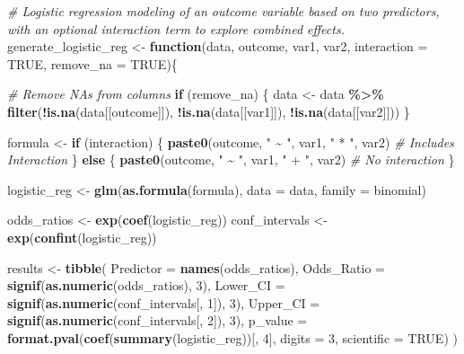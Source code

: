 \documentclass[
]{article}
\newenvironment{Shaded}{\begin{snugshade}}{\end{snugshade}}
\newcommand{\AttributeTok}[1]{\textcolor[rgb]{0.13,0.29,0.53}{#1}}
\newcommand{\CommentTok}[1]{\textcolor[rgb]{0.56,0.35,0.01}{\textit{#1}}}
\newcommand{\ConstantTok}[1]{\textcolor[rgb]{0.56,0.35,0.01}{#1}}
\newcommand{\ControlFlowTok}[1]{\textcolor[rgb]{0.13,0.29,0.53}{\textbf{#1}}}
\newcommand{\DecValTok}[1]{\textcolor[rgb]{0.00,0.00,0.81}{#1}}
\newcommand{\FunctionTok}[1]{\textcolor[rgb]{0.13,0.29,0.53}{\textbf{#1}}}
\newcommand{\NormalTok}[1]{#1}
\newcommand{\OtherTok}[1]{\textcolor[rgb]{0.56,0.35,0.01}{#1}}
\newcommand{\SpecialCharTok}[1]{\textcolor[rgb]{0.81,0.36,0.00}{\textbf{#1}}}
\newcommand{\StringTok}[1]{\textcolor[rgb]{0.31,0.60,0.02}{#1}}
\begin{document}
\begin{Shaded}
\begin{Highlighting}[]
\CommentTok{\# Logistic regression modeling of an outcome variable based on two predictors, with an optional interaction term to explore combined effects.}
\NormalTok{generate\_logistic\_reg }\OtherTok{\textless{}{-}} \ControlFlowTok{function}\NormalTok{(data, outcome, var1, var2, }\AttributeTok{interaction =} \ConstantTok{TRUE}\NormalTok{, }\AttributeTok{remove\_na =} \ConstantTok{TRUE}\NormalTok{)\{}
  
  \CommentTok{\# Remove NAs from columns}
  \ControlFlowTok{if}\NormalTok{ (remove\_na) \{}
\NormalTok{    data }\OtherTok{\textless{}{-}}\NormalTok{ data }\SpecialCharTok{\%\textgreater{}\%} 
      \FunctionTok{filter}\NormalTok{(}\SpecialCharTok{!}\FunctionTok{is.na}\NormalTok{(data[[outcome]]), }\SpecialCharTok{!}\FunctionTok{is.na}\NormalTok{(data[[var1]]), }\SpecialCharTok{!}\FunctionTok{is.na}\NormalTok{(data[[var2]]))}
\NormalTok{  \}}
  
\NormalTok{  formula }\OtherTok{\textless{}{-}} \ControlFlowTok{if}\NormalTok{ (interaction) \{}
    \FunctionTok{paste0}\NormalTok{(outcome, }\StringTok{" \textasciitilde{} "}\NormalTok{, var1, }\StringTok{" * "}\NormalTok{, var2) }\CommentTok{\# Includes Interaction}
\NormalTok{  \} }\ControlFlowTok{else}\NormalTok{ \{}
    \FunctionTok{paste0}\NormalTok{(outcome, }\StringTok{" \textasciitilde{} "}\NormalTok{, var1, }\StringTok{" + "}\NormalTok{, var2) }\CommentTok{\# No interaction}
\NormalTok{  \}}
  
\NormalTok{  logistic\_reg }\OtherTok{\textless{}{-}} \FunctionTok{glm}\NormalTok{(}\FunctionTok{as.formula}\NormalTok{(formula), }\AttributeTok{data =}\NormalTok{ data, }\AttributeTok{family =}\NormalTok{ binomial)}
  
\NormalTok{  odds\_ratios }\OtherTok{\textless{}{-}} \FunctionTok{exp}\NormalTok{(}\FunctionTok{coef}\NormalTok{(logistic\_reg))}
\NormalTok{  conf\_intervals }\OtherTok{\textless{}{-}} \FunctionTok{exp}\NormalTok{(}\FunctionTok{confint}\NormalTok{(logistic\_reg))}
  
\NormalTok{  results }\OtherTok{\textless{}{-}} \FunctionTok{tibble}\NormalTok{(}
    \AttributeTok{Predictor =} \FunctionTok{names}\NormalTok{(odds\_ratios),}
    \AttributeTok{Odds\_Ratio =} \FunctionTok{signif}\NormalTok{(}\FunctionTok{as.numeric}\NormalTok{(odds\_ratios), }\DecValTok{3}\NormalTok{),}
    \AttributeTok{Lower\_CI =} \FunctionTok{signif}\NormalTok{(}\FunctionTok{as.numeric}\NormalTok{(conf\_intervals[, }\DecValTok{1}\NormalTok{]), }\DecValTok{3}\NormalTok{),}
    \AttributeTok{Upper\_CI =} \FunctionTok{signif}\NormalTok{(}\FunctionTok{as.numeric}\NormalTok{(conf\_intervals[, }\DecValTok{2}\NormalTok{]), }\DecValTok{3}\NormalTok{),}
    \AttributeTok{p\_value =} \FunctionTok{format.pval}\NormalTok{(}\FunctionTok{coef}\NormalTok{(}\FunctionTok{summary}\NormalTok{(logistic\_reg))[, }\DecValTok{4}\NormalTok{], }\AttributeTok{digits =} \DecValTok{3}\NormalTok{, }\AttributeTok{scientific =} \ConstantTok{TRUE}\NormalTok{)}
\NormalTok{  )}
  

\end{Highlighting}
\end{Shaded}
\end{document}
